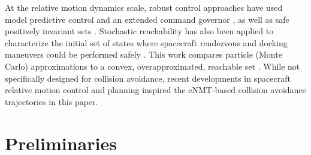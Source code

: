 \documentclass[twocolumn,letterpaper]{IEEEAerospaceCLS}  %
\theoremstyle{definition}
\begin{document}
At the relative motion dynamics scale, robust control approaches have used model predictive control and an extended command governor \cite{Petersen2014}, as well as safe positively invariant sets \cite{weiss2014safe}. %
%
Stochastic reachability has also been applied to characterize the initial set of states where spacecraft rendezvous and docking maneuvers could be performed safely \cite{lesser2013stochastic}. This work compares particle (Monte Carlo) approximations \cite{nemirovski2006scenario,blackmore2010probabilistic} to a convex, overapproximated, reachable set \cite{blackmore2009convex,vitus2011closed}. 
%
While not specifically designed for collision avoidance, recent developments in spacecraft relative motion control and planning \cite{frey2017constrained,frey2018invariance,frey2017incorporating,frey2016time,frey2017parameter,Petersen2014,starek2016real} inspired the eNMT-based collision avoidance trajectories in this paper. 
\section{Preliminaries}
\end{document}
